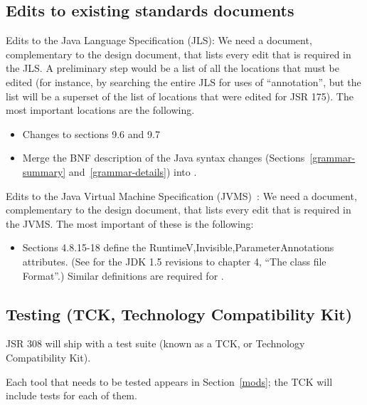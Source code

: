 \documentclass[10pt]{article}
\begin{document}
\subsection{Edits to existing standards documents\label{edits-to-standards}}

Edits to the Java Language Specification (JLS):
      We need a document, complementary to the design document, that lists
      every edit that is required in the JLS.
      A preliminary step would be a list of all the locations that must be
      edited (for instance, by searching the entire JLS for uses of
      ``annotation'', but the list will be a superset of the list of
      locations that were edited for
      JSR 175).
      The most important locations are the following.
\begin{itemize}
\item
Changes to sections 9.6 and 9.7
\item
Merge the BNF description of the Java syntax changes
(Sections~\ref{grammar-summary} and~\ref{grammar-details})
into .
\end{itemize}

Edits to the Java Virtual Machine Specification (JVMS)~\cite{LindholmY99,LindholmY99:CFF5}:
      We need a document, complementary to the design document, that lists
      every edit that is required in the JVMS\@.
      The most important of these is the following:
\begin{itemize}
\item
        Sections 4.8.15-18 define the Runtime{V,Inv}isible{,Parameter}Annotations
        attributes.  (See
        for the JDK 1.5 revisions to chapter 4, ``The class file Format''.)
        Similar definitions are required for \RuntimeInOrVisibleTypeAnnotations.
\end{itemize}



\subsection{Testing (TCK, Technology Compatibility Kit)\label{testing}}

JSR 308 will ship with a test suite (known as a TCK, or Technology
Compatibility Kit).

Each tool that needs to be tested appears in Section~\ref{mods};
the TCK will include tests for each of them.
\end{document}
